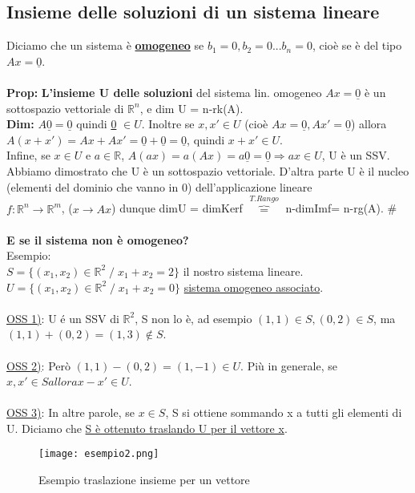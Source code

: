 \documentclass[12pt]{article}
\begin{document}
\subsection{Insieme delle soluzioni di un sistema lineare}
Diciamo che un sistema è \textbf{\underline{omogeneo}} se $b_1=0, b_2=0...b_n=0$, cioè se è del tipo $Ax=\underline{0}$.\\\\
\textbf{Prop:} \textbf{L'insieme U delle soluzioni} del sistema lin. omogeneo $Ax = \underline{0}$ è un sottospazio vettoriale di $\mathbb{R}^n$, e dim U = n-rk(A).\\
\textbf{Dim:} $A\underline{0}=\underline{0}$ quindi \underline{0} $\in U$. Inoltre se $x,x' \in U$ (cioè $Ax=\underline{0}, Ax'=\underline{0}$) allora $A(x+x')=Ax+Ax'=\underline{0}+\underline{0}=\underline{0}$, quindi $x+x' \in U$.\\
Infine, se $x \in U$ e $a \in \mathbb{R}$, $A(ax) = a(Ax)= a\underline{0} = \underline{0} \Rightarrow ax \in U$, U è un SSV.\\
Abbiamo dimostrato che U è un sottospazio vettoriale. D'altra parte U è il nucleo (elementi del dominio che vanno in 0) dell'applicazione lineare\\ $f: \mathbb{R}^n \longrightarrow \mathbb{R}^m$, ($x \longrightarrow Ax$) dunque dimU = dimKerf $\overbrace{=}^{T.Rango}$ n-dimImf= n-rg(A). \#\\\\
\textbf{E se il sistema non è omogeneo?}\\
Esempio:\\
$S=\{(x_1,x_2)\in \mathbb{R}^2 \;/\; x_1+x_2 = 2\}$ il nostro sistema lineare.\\
$U = \{(x_1,x_2)\in \mathbb{R}^2 \;/\; x_1+x_2 = 0\}$ \underline{sistema omogeneo associato}.\\\\
\underline{OSS 1)}: U é un SSV di $\mathbb{R}^2$, S non lo è, ad esempio $(1,1) \in S, (0,2) \in S$, ma $(1,1) + (0,2) = (1,3) \notin S$.\\\\
\underline{OSS 2)}: Però $(1,1) - (0,2) = (1,-1) \in U$. Più in generale, se $x,x' \in S allora x-x' \in U$.\\\\
\underline{OSS 3)}: In altre parole, se $x \in S$, S si ottiene sommando x a tutti gli elementi di U. Diciamo che \underline{S è ottenuto traslando U per il vettore x}.
\begin{figure}[h!]
        \centering
        \texttt{[image: esempio2.png]}
        \caption{Esempio traslazione insieme per un vettore}
        \label{esempio traslazione}
\end{figure}
\\\\\\
\end{document}
